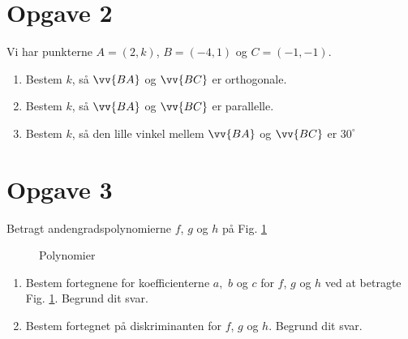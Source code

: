 \documentclass[12pt]{article}
\begin{document}
\section*{Opgave 2}
Vi har punkterne $A = (2,k)$, $B =(-4,1)$ og $C = (-1,-1)$.
\begin{enumerate}[label=\roman*)]
\item Bestem $k$, så $\vv{BA}$ og $\vv{BC}$ er orthogonale.
\item Bestem $k$, så $\vv{BA}$ og $\vv{BC}$ er parallelle. 
\item Bestem $k$, så den lille vinkel mellem $\vv{BA}$ og $\vv{BC}$ er $30^\circ$
\end{enumerate}

\section*{Opgave 3}
Betragt andengradspolynomierne $f$, $g$ og $h$ på Fig. \ref{fig:poly}
\begin{figure}[H]
\centering
{}
\caption{Polynomier}
\label{fig:poly}
\end{figure}
\begin{enumerate}[label=\roman*)]
\item Bestem fortegnene for koefficienterne $a,$ $b$ og $c$ for $f$, $g$ og $h$ ved at betragte Fig. \ref{fig:poly}. Begrund dit svar.
\item Bestem fortegnet på diskriminanten for $f$, $g$ og $h$. Begrund dit svar. 
\end{enumerate}
\end{document}
